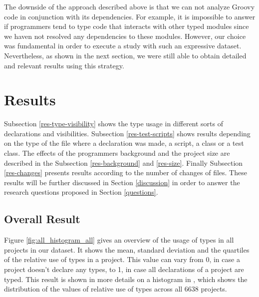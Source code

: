\documentclass[preprint]{sigplanconf}
\begin{document}
The downside of the approach described above is that we can not analyze Groovy code in conjunction with its dependencies. 
For example, it is impossible to answer if programmers tend to type code that interacts with other typed modules since we haven not resolved any dependencies to these modules.
However, our choice was fundamental in order to execute a study with such an expressive dataset.
Nevertheless, as shown in the next section, we were still able to obtain detailed and relevant results using this strategy.











%
%
\section{Results\label{results}}

Subsection \ref{res-type-visibility} shows the type usage in different sorts of declarations and visibilities.
Subsection \ref{res-test-scripts} shows results depending on the type of the file where a declaration was made, a script, a class or a test class.
The effects of the programmers background and the project size are described in the Subsection \ref{res-background} and \ref{res-size}.
Finally Subsection \ref{res-changes} presents results according to the number of changes of files.
These results will be further discussed in Section \ref{discussion} in order to answer the research questions proposed in Section \ref{questions}.

\subsection{Overall Result\label{res-overall}}
Figure \ref{fig:all_histogram_all} gives an overview of the usage of types in all projects in our dataset.
It shows the mean, standard deviation and the quartiles of the relative use of types in a project. 
This value can vary from 0, in case a project doesn't declare any types, to 1, in case all declarations of a project are typed. 
This result is shown in more details on a histogram in , which shows the distribution of the values of relative use of types across all 6638 projects.
\end{document}
